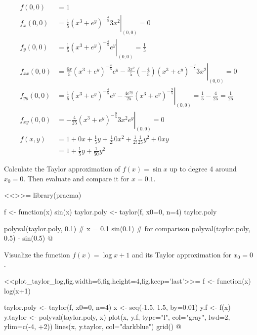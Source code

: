 \documentclass
[answers]
{exercise_sheet}
\begin{document}
\makeatletter\if@answers\begin{Answer}{10}
\begin{align*}
f(0,0) &= 1 \\
f_x(0,0) &= \left. \frac{1}{5}\left(x^3+e^y\right)^{-\frac{4}{5}}3x^2 \right|_{(0,0)} = 0 \\
f_y(0,0) &= \left. \frac{1}{5}\left(x^3+e^y\right)^{-\frac{4}{5}}e^y \right|_{(0,0)} = \frac{1}{5} \\
f_{xx}(0,0) &= \left. \frac{6x}{5}\left(x^3+e^y\right)^{-\frac{4}{5}}e^y-\frac{3x^2}{5}\left(-\frac{4}{5}\right)\left(x^3+e^y\right)^{-\frac{9}{5}}3x^2 \right|_{(0,0)} = 0 \\
f_{yy}(0,0) &= \left. \frac{1}{5}\left(x^3+e^y\right)^{-\frac{4}{5}}e^y-\frac{4e^{2y}}{25}\left(x^3+e^y\right)^{-\frac{9}{5}} \right|_{(0,0)} = \frac{1}{5}-\frac{4}{25} = \frac{1}{25} \\
f_{xy}(0,0) &= \left. -\frac{4}{25}\left(x^3+e^y\right)^{-\frac{9}{5}}3x^2e^y \right|_{(0,0)} = 0 \\
f(x,y) &= 1 + 0x + \frac{1}{5}y + \frac{1}{2!}0x^2 + \frac{1}{2!}\frac{1}{25}y^2 + 0xy \\
&= 1 + \frac{1}{5}y + \frac{1}{50}y^2
\end{align*}
\end{Answer}\fi\makeatother

\begin{Question}{2}
Calculate the Taylor approximation of $f(x) = \sin{x}$ up to degree 4 around $x_0 = 0$. Then evaluate and compare it for $x = 0.1$.
\end{Question}

\makeatletter\if@answers\begin{Answer}{4}
<<>>=
library(pracma)

f <- function(x) sin(x)
taylor.poly <- taylor(f, x0=0, n=4)
taylor.poly

polyval(taylor.poly, 0.1) # x = 0.1
sin(0.1) # for comparison
polyval(taylor.poly, 0.5) - sin(0.5)
@
\end{Answer}\fi\makeatother

\begin{Question}{1}
Visualize the function $f(x) = \log{x+1}$ and its Taylor approximation for $x_0 = 0$.
\end{Question}

\makeatletter\if@answers\begin{Answer}{2}
<<plot_taylor_log,fig.width=6,fig.height=4,fig.keep='last'>>=
f <- function(x) log(x+1)

taylor.poly <- taylor(f, x0=0, n=4)
x <- seq(-1.5, 1.5, by=0.01)
y.f <- f(x)
y.taylor <- polyval(taylor.poly, x)
plot(x, y.f, type="l", col="gray", lwd=2, ylim=c(-4, +2))
lines(x, y.taylor, col="darkblue")
grid()
@
\end{Answer}\fi\makeatother
\end{document}
